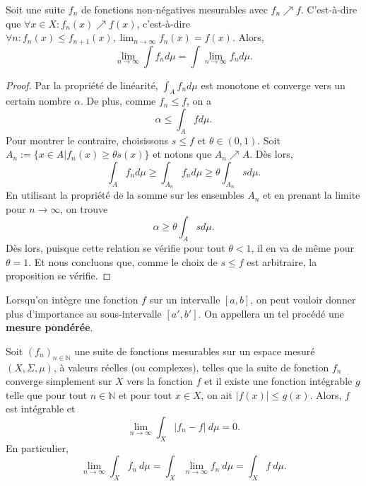 \begin{theo}
    Soit une suite $f_n$ de fonctions non-négatives mesurables avec $f_n\nearrow f$. C'est-à-dire que $\forall x\in X : f_n(x)\nearrow f(x)$, c'est-à-dire $\forall n : f_n(x) \leq f_{n+1}(x), \lim_{n\to\infty}f_n(x)=f(x)$. Alors,
    \begin{equation}
        \lim_{n\to\infty} \int f_n d\mu = \int \lim_{n\to\infty} f_n d\mu.
    \end{equation}
\end{theo}
\begin{proof}
    Par la propriété de linéarité, $\int_A f_n d\mu$ est monotone et converge vers un certain nombre $\alpha$. De plus, comme $f_n\leq f$, on a
    \begin{equation*}
        \alpha \leq \int_A f d\mu.
    \end{equation*}
    Pour montrer le contraire, choisissons $s\leq f$ et $\theta\in(0,1)$. Soit $A_n := \{x\in A|f_n(x)\geq\theta s(x)\}$ et notons que $A_n\nearrow A$. Dès lors,
    \begin{equation*}
        \int_A f_n d\mu \geq \int_{A_n} f_n d\mu \geq \theta \int_{A_n} s d\mu.
    \end{equation*}
    En utilisant la propriété de la somme sur les ensembles $A_n$ et en prenant la limite pour $n\to\infty$, on trouve
    \begin{equation*}
        \alpha \geq \theta \int_A s d\mu.
    \end{equation*}
    Dès lors, puisque cette relation se vérifie pour tout $\theta<1$, il en va de même pour $\theta=1$. Et nous concluons que, comme le choix de $s\leq f$ est arbitraire, la proposition se vérifie.
\end{proof}

Lorsqu'on intègre une fonction $f$ sur un intervalle $[a,b]$, on peut vouloir donner plus d'importance au sous-intervalle $[a',b']$. On appellera un tel procédé une \textbf{mesure pondérée}.

\begin{theo}
    Soit $(f_n)_{n\in\mathbb{N}}$ une suite de fonctions mesurables sur un espace mesuré $(X,\Sigma,\mu)$, à valeurs réelles (ou complexes), telles que la suite de fonction $f_n$ converge simplement sur $X$ vers la fonction $f$ et il existe une fonction intégrable $g$ telle que pour tout $n\in\mathbb{N}$ et pour tout $x\in X$, on ait $|f(x)|\leq g(x)$. Alors, $f$ est intégrable et
    \begin{equation}
        \lim_{n\rightarrow\infty}\int_X |f_n-f|\ d\mu = 0.
    \end{equation}
    En particulier,
    \begin{equation*}
        \lim_{n\rightarrow\infty} \int_X f_n\ d\mu = \int_X \lim_{n\rightarrow\infty}f_n\ d\mu = \int_X f\ d\mu.
    \end{equation*}
\end{theo}


